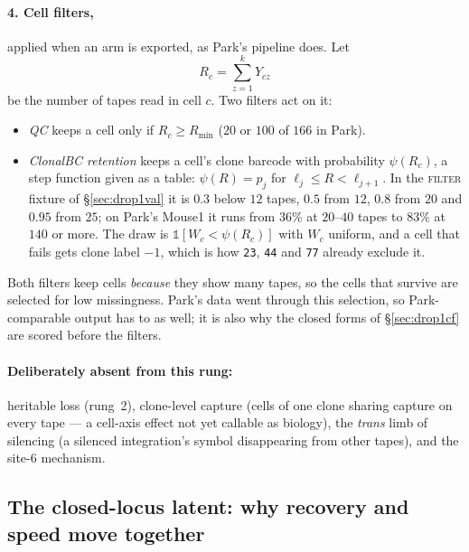 \paragraph{4. Cell filters,} applied when an arm is exported, as Park's pipeline does. Let
\begin{equation}
  R_c=\sum_{z=1}^kY_{cz}
  \label{eq:Rc}
\end{equation}
be the number of tapes read in cell $c$. Two filters act on it:
\begin{itemize}
  \item \emph{QC} keeps a cell only if $R_c\ge R_{\min}$ ($20$ or $100$ of $166$ in Park).
  \item \emph{ClonalBC retention} keeps a cell's clone barcode with probability $\psi(R_c)$, a step
        function given as a table: $\psi(R)=p_j$ for $\ell_j\le R<\ell_{j+1}$. In the \textsc{filter}
        fixture of \S\ref{sec:drop1val} it is $0.3$ below $12$ tapes, $0.5$ from $12$, $0.8$ from $20$
        and $0.95$ from $25$; on Park's Mouse1 it runs from $36\%$ at $20$--$40$ tapes to $83\%$ at
        $140$ or more. The draw is $\mathbb 1[W_c<\psi(R_c)]$ with $W_c$ uniform, and a cell that
        fails gets clone label $-1$, which is how \texttt{23}, \texttt{44} and \texttt{77} already
        exclude it.
\end{itemize}
Both filters keep cells \emph{because} they show many tapes, so the cells that survive are selected
for low missingness. Park's data went through this selection, so Park-comparable output has to as
well; it is also why the closed forms of \S\ref{sec:drop1cf} are scored before the filters.

\paragraph{Deliberately absent from this rung:} heritable loss (rung~2), clone-level capture (cells
of one clone sharing capture on every tape --- a cell-axis effect not yet callable as biology), the
\emph{trans} limb of silencing (a silenced integration's symbol disappearing from other tapes), and
the site-6 mechanism.

\subsection{The closed-locus latent: why recovery and speed move together}\label{sec:latent}

